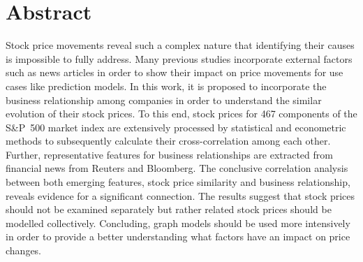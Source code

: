 \section*{Abstract}
Stock price movements reveal such a complex nature that identifying their causes is impossible to fully address. Many previous studies incorporate external factors such as news articles in order to show their impact on price movements for use cases like prediction models. In this work, it is proposed to incorporate the business relationship among companies in order to understand the similar evolution of their stock prices. To this end, stock prices for 467 components of the S\&P~500 market index are extensively processed by statistical and econometric methods to subsequently calculate their cross-correlation among each other. Further, representative features for business relationships are extracted from financial news from Reuters and Bloomberg. The conclusive correlation analysis between both emerging features, stock price similarity and business relationship, reveals evidence for a significant connection. The results suggest that stock prices should not be examined separately but rather related stock prices should be modelled collectively. Concluding, graph models should be used more intensively in order to provide a better understanding what factors have an impact on price changes.










